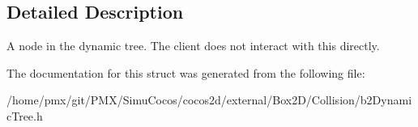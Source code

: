 \subsection{Detailed Description}
A node in the dynamic tree. The client does not interact with this directly. 

The documentation for this struct was generated from the following file\+:\begin{DoxyCompactItemize}
\item 
/home/pmx/git/\+P\+M\+X/\+Simu\+Cocos/cocos2d/external/\+Box2\+D/\+Collision/b2\+Dynamic\+Tree.\+h\end{DoxyCompactItemize}

